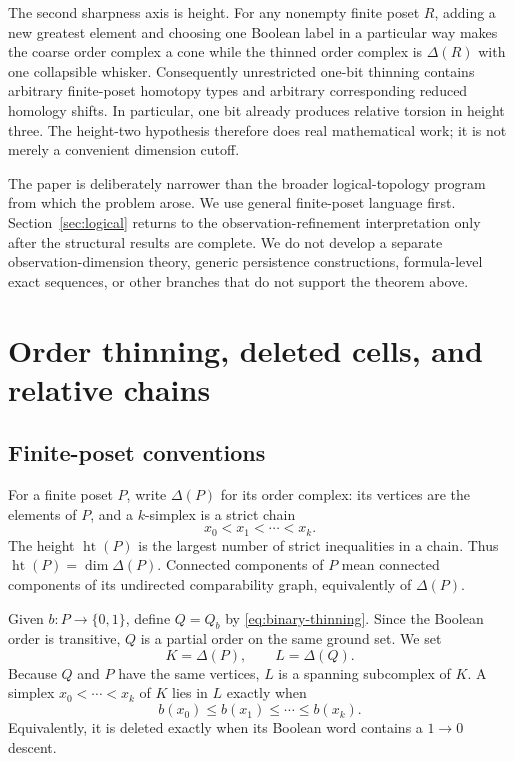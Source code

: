 \documentclass[11pt]{article}
\theoremstyle{definition}
\theoremstyle{remark}
\DeclareMathOperator{\posht}{ht}
\newcommand{\D}{\Delta}
\begin{document}
The second sharpness axis is height.  For any nonempty finite poset $R$, adding a new
greatest element and choosing one Boolean label in a particular way makes the coarse
order complex a cone while the thinned order complex is $\D(R)$ with one collapsible
whisker.  Consequently unrestricted one-bit thinning contains arbitrary finite-poset
homotopy types and arbitrary corresponding reduced homology shifts.  In particular,
one bit already produces relative torsion in height three.  The height-two hypothesis
therefore does real mathematical work; it is not merely a convenient dimension cutoff.

The paper is deliberately narrower than the broader logical-topology program from which
the problem arose.  We use general finite-poset language first.  Section~\ref{sec:logical}
returns to the observation-refinement interpretation only after the structural results
are complete.  We do not develop a separate observation-dimension theory, generic
persistence constructions, formula-level exact sequences, or other branches that do
not support the theorem above.

\section{Order thinning, deleted cells, and relative chains}\label{sec:setup}

\subsection{Finite-poset conventions}

For a finite poset $P$, write $\D(P)$ for its order complex: its vertices are the
elements of $P$, and a $k$-simplex is a strict chain
\[
  x_0<x_1<\cdots<x_k.
\]
The height $\posht(P)$ is the largest number of strict inequalities in a chain.  Thus
$\posht(P)=\dim\D(P)$.  Connected components of $P$ mean connected components of its
undirected comparability graph, equivalently of $\D(P)$.

Given $b:P\to\{0,1\}$, define $Q=Q_b$ by \eqref{eq:binary-thinning}.  Since the
Boolean order is transitive, $Q$ is a partial order on the same ground set.  We set
\[
  K=\D(P),\qquad L=\D(Q).
\]
Because $Q$ and $P$ have the same vertices, $L$ is a spanning subcomplex of $K$.
A simplex $x_0<\cdots<x_k$ of $K$ lies in $L$ exactly when
\[
  b(x_0)\le b(x_1)\le\cdots\le b(x_k).
\]
Equivalently, it is deleted exactly when its Boolean word contains a $1\to0$ descent.
\end{document}
